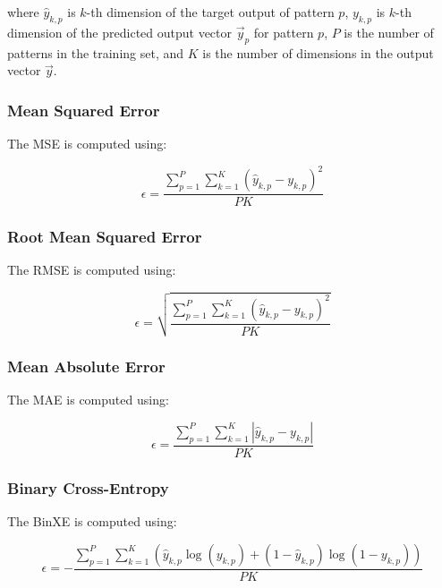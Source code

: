 \noindent where $\hat{y}_{k,p}$ is $k$-th dimension of the target output of
pattern $p$, $y_{k,p}$ is $k$-th dimension of the predicted output vector
$\vec{y}_{p}$ for pattern $p$, $P$ is the number of patterns in the training
set, and $K$ is the number of dimensions in the output vector $\vec{y}$.


\subsubsection{Mean Squared Error}
\label{sec:anns:training:error_functions:mse}

The \ac{MSE} is computed using:

\begin{equation}
    \epsilon = \frac{\sum_{p=1}^P \sum_{k=1}^K (\hat{y}_{k,p} - y_{k,p})^2}{PK}
    \label{eq:mse}
\end{equation}


\subsubsection{Root Mean Squared Error}
\label{sec:anns:training:error_functions:rmse}

The \ac{RMSE} is computed using:

\begin{equation}
    \epsilon = \sqrt{\frac{\sum_{p=1}^P \sum_{k=1}^K (\hat{y}_{k,p} - y_{k,p})^2}{PK}}
    \label{eq:rmse}
\end{equation}


\subsubsection{Mean Absolute Error}
\label{sec:anns:training:error_functions:mae}

The \ac{MAE} is computed using:

\begin{equation}
    \epsilon = \frac{\sum_{p=1}^P \sum_{k=1}^K |\hat{y}_{k,p} - y_{k,p}|}{PK}
    \label{eq:mae}
\end{equation}


\subsubsection{Binary Cross-Entropy}
\label{sec:anns:training:error_functions:bin_xe}

\noindent The \ac{BinXE} is computed using:

\begin{equation}
    \epsilon = -\frac{\sum_{p=1}^P \sum_{k=1}^K (\hat{y}_{k,p} \log{(y_{k,p})} + (1 - \hat{y}_{k,p})\log{(1 - y_{k,p})})}{PK}
    \label{eq:bin_xe}
\end{equation}

